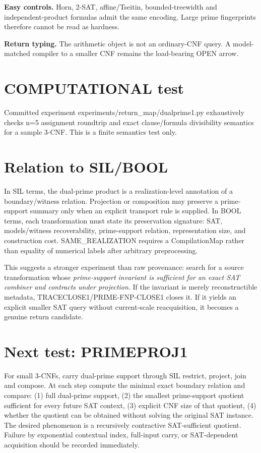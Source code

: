 \documentclass[11pt]{article}
\begin{document}
\textbf{Easy controls.} Horn, 2-SAT, affine/Tseitin, bounded-treewidth and independent-product formulas admit the same encoding. Large prime fingerprints therefore cannot be read as hardness.

\textbf{Return typing.} The arithmetic object is not an ordinary-CNF query. A model-matched compiler to a smaller CNF remains the load-bearing OPEN arrow.

\section*{COMPUTATIONAL test}
Committed experiment experiments/return_map/dualprime1.py exhaustively checks n=5 assignment roundtrip and exact clause/formula divisibility semantics for a sample 3-CNF. This is a finite semantics test only.

\section*{Relation to SIL/BOOL}
In SIL terms, the dual-prime product is a realization-level annotation of a boundary/witness relation. Projection or composition may preserve a prime-support summary only when an explicit transport rule is supplied. In BOOL terms, each transformation must state its preservation signature: SAT, models/witness recoverability, prime-support relation, representation size, and construction cost. SAME_REALIZATION requires a CompilationMap rather than equality of numerical labels after arbitrary preprocessing.

This suggests a stronger experiment than raw provenance: search for a source transformation whose \emph{prime-support invariant is sufficient for an exact SAT combiner and contracts under projection}. If the invariant is merely reconstructible metadata, TRACECLOSE1/PRIME-FNP-CLOSE1 closes it. If it yields an explicit smaller SAT query without current-scale reacquisition, it becomes a genuine return candidate.

\section*{Next test: PRIMEPROJ1}
For small 3-CNFs, carry dual-prime support through SIL restrict, project, join and compose. At each step compute the minimal exact boundary relation and compare:
(1) full dual-prime support,
(2) the smallest prime-support quotient sufficient for every future SAT context,
(3) explicit CNF size of that quotient,
(4) whether the quotient can be obtained without solving the original SAT instance.
The desired phenomenon is a recursively contractive SAT-sufficient quotient. Failure by exponential contextual index, full-input carry, or SAT-dependent acquisition should be recorded immediately.
\end{document}

